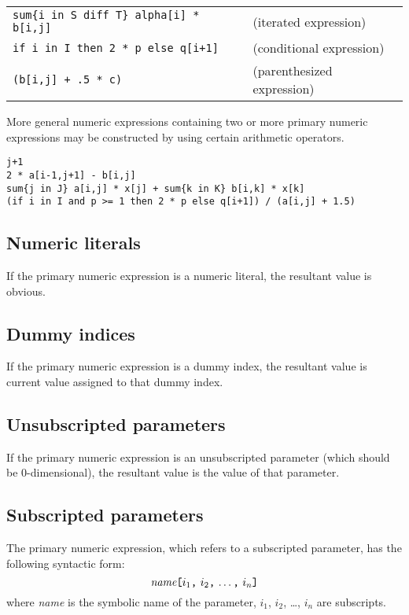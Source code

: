 \documentclass[11pt]{report}
\def\para#1{\noindent{\bf#1}}
\begin{document}
\newpage

\noindent
\begin{tabular}{@{}ll@{}}
\verb|sum{i in S diff T} alpha[i] * b[i,j]|&(iterated expression)\\
\verb|if i in I then 2 * p else q[i+1]|&(conditional expression)\\
\verb|(b[i,j] + .5 * c)|&(parenthesized expression)\\
\end{tabular}

More general numeric expressions containing two or more primary numeric
expressions may be constructed by using certain arithmetic operators.

\para{Examples}

\begin{verbatim}
j+1
2 * a[i-1,j+1] - b[i,j]
sum{j in J} a[i,j] * x[j] + sum{k in K} b[i,k] * x[k]
(if i in I and p >= 1 then 2 * p else q[i+1]) / (a[i,j] + 1.5)
\end{verbatim}

\subsection{Numeric literals}

If the primary numeric expression is a numeric literal, the resultant
value is obvious.

\subsection{Dummy indices}

If the primary numeric expression is a dummy index, the resultant value
is current value assigned to that dummy index.

\subsection{Unsubscripted parameters}

If the primary numeric expression is an unsubscripted parameter (which
should be 0-dimen\-sional), the resultant value is the value of that
parameter.

\subsection{Subscripted parameters}

The primary numeric expression, which refers to a subscripted
parameter, has the following syntactic form:
$$
\mbox{{\it name}{\tt[}$i_1${\tt,} $i_2${\tt,} \dots{\tt,} $i_n${\tt]}}
$$
where {\it name} is the symbolic name of the parameter, $i_1$, $i_2$,
\dots, $i_n$ are subscripts.
\end{document}
